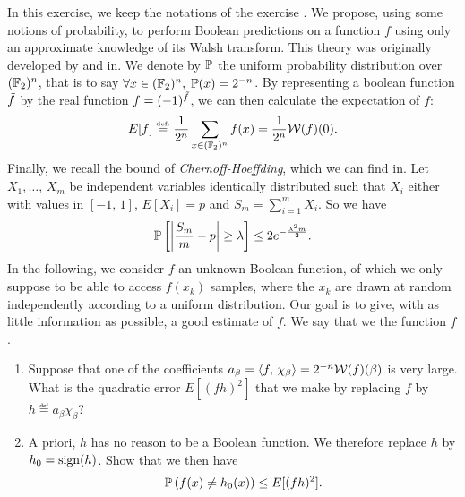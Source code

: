  
\begin{exo}
\label{exo-learning-boolean-functions}
 
   In this exercise, we keep the notations of the exercise . We propose, using some notions of probability, to perform Boolean predictions on a function $ f $ using only an approximate knowledge of its Walsh transform. This theory was originally developed by  and  in{\upshape \cite{kushilevitz-learning-decision-tree}}. We denote by $ \mathbb{P} $ the uniform probability distribution over $ (\mathbb{F}_2)^n $, that is to say $ \forall x \in (\mathbb{F}_2)^n, \; \mathbb{P} (x) = 2^{- n} $. By representing a boolean function $ \tilde{f} $ by the real function $ f = (-1)^{\tilde{f}} $, we can then calculate the expectation of $ f $:
\begin{equation*}
E [f] \stackrel{\mbox{\upshape\tiny def.}}{=} \frac{1}{2^{n}} \sum_{x \in (\mathbb{F}_2)^n}{f(x)} = \frac{1}{2^{n}} \mathcal{W} (f) (0).
\end{equation*}
Finally, we recall the bound of \textit{Chernoff-Hoeffding}, which we can find in{\upshape \cite{ouvrard-2}}. Let $ X_1, \ldots, \, X_m $ be independent variables identically distributed such that $ X_i $ either with values in $ [- 1, \, 1] $, $ E [X_i] = p $ and $ S_m = \sum_{i = 1}^m{X_i} $. So we have
\begin{equation*}
\mathbb{P} \left[\left| \frac{S_m}{m} - p \right| \geq \lambda \right] \leq 2 e^{- \frac{\lambda^2 m}{2}}.
\end{equation*}
In the following, we consider $ f $ an unknown Boolean function, of which we only suppose to be able to access $ f(x_k) $ samples, where the $ x_k $ are drawn at random independently according to a uniform distribution. Our goal is to give, with as little information as possible, a good estimate of $ f $. We say that we  the function $ f $. \begin{enumerate}
\item Suppose that one of the coefficients $ a_\beta = \langle f,\,\chi_\beta\rangle = 2^{- n} \mathcal{W} (f) (\beta) $ is very large. What is the quadratic error $ E [(fh)^2] $ that we make by replacing $ f $ by $ h \eqdef a_\beta \chi_\beta $?
\item A priori, $ h $ has no reason to be a Boolean function. We therefore replace $ h $ by $ h_0 = \operatorname{sign} (h) $. Show that we then have
\begin{equation*}
\mathbb{P} \left(f(x) \neq h_0 (x) \right) \leq E [(fh)^2].
\end{equation*}
 

\end{enumerate}
\end{exo}
